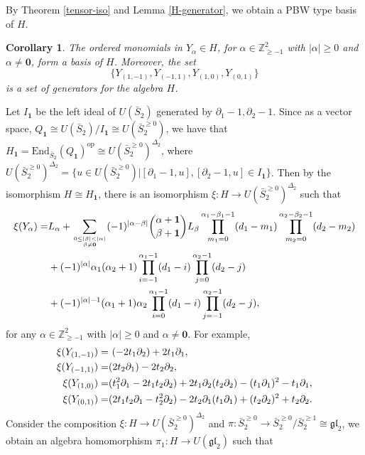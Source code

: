 \documentclass[12pt,a4paper]{amsart}
\newtheorem{Corollary}[Theorem]{Corollary}
\def\Z{\mathbb{Z}}
\def\m1{\mathbf{1}}
\def\gl{\mathfrak{gl}}
\def\p{\partial}
\def\a{\alpha}
\def\be{\beta}
\def\bS{\bar{S}_2}
\begin{document}



By Theorem \ref{tensor-iso} and Lemma \ref{H-generator}, we obtain a PBW type basis of $H$.

\begin{Corollary}\label{PBW}
The ordered monomials  in $Y_\a\in H$, for $\a\in \Z_{\geq-1}^2$ with $|\a|\geq0$ and $\a\neq \mathbf{0}$, form a basis of $H$. Moreover, the set $$\{Y_{(1,-1)},Y_{(-1,1)},Y_{(1,0)},Y_{(0,1)}\}$$
 is a set of generators for the algebra $H$.
\end{Corollary}


Let $I_{\mathbf{1}}$ be the left ideal of $U(\bS)$ generated by $\p_1-1,\p_2-1$.  Since  as a vector space, $Q_{\m1}\cong U(\bS)/I_{\mathbf{1}}\cong U(\bS^{\geq 0})$, we have that
$H_{\m1}=\text{End}_{\bar{S}_2}(Q_{\m1})^{\text{op}}\cong U(\bS^{\geq 0})^{\Delta_2}$,
where $U(\bS^{\geq 0})^{\Delta_2}=\{u\in U(\bS^{\geq 0})| [\p_1-1,u], [\p_2-1, u]\in I_{\mathbf{1}}\}$. Then by the isomorphism $H\cong H_{\mathbf{1}}$,
there is an isomorphism $\xi: H\rightarrow U(\bS^{\geq 0})^{\Delta_2}$
such that
\begin{align*} \label{x-operator}
 \xi(Y_{\a})= &L_\a
+\sum_{0\leq|\be|<|\a|\atop \be\neq \mathbf{0}}(-1)^{|\a-\be|}
\binom{\a+\mathbf{1}}{\be+\mathbf{1}}L_\be
\prod_{m_1=0}^{\a_1-\be_1-1}(d_1-m_1)
\prod_{m_2=0}^{\a_2-\be_2-1}(d_2-m_2)\\
&+(-1)^{|\a|}\a_1(\a_2+1)\prod_{i=-1}^{\a_1-1}(d_1-i)
\prod_{j=0}^{\a_2-1}(d_2-j)\\
&+(-1)^{|\a|-1}(\a_1+1)\a_2\prod_{i=0}^{\a_1-1}(d_1-i)
\prod_{j=-1}^{\a_2-1}(d_2-j),\end{align*}
for any $\a\in \Z_{\geq-1}^2$ with $|\a|\geq0$ and $\a\neq\mathbf{0}$.
For example,
 \begin{equation}\label{x-w-def1}
 \aligned  \xi(Y_{(1,-1)})= &\  (-2t_1\p_2)+2t_1\p_1 ,\\
 \xi(Y_{(-1,1)})= &(2t_2\p_1)-2t_2\p_2 ,\\
 \xi(Y_{(1,0)})=&(t_1^2\p_1-2t_1t_2\p_2)+2t_1\p_2(t_2\p_2)-(t_1\p_1)^2-t_1\p_1, \\
 \xi(Y_{(0,1)})=&(2t_1t_2\p_1-t_2^2\p_2)-2t_2\p_1(t_1\p_1)+(t_2\p_2)^2+t_2\p_2. \endaligned\end{equation}
 Consider the composition $\xi: H\rightarrow U(\bS^{\geq 0})^{\Delta_2}$
 and $\pi:\bS^{\geq 0}\rightarrow \bS^{\geq 0}/\bS^{\geq 1} \cong \gl_2$,
 we obtain an algebra homomorphism $\pi_1: H\rightarrow U(\gl_2)$
 such that
\end{document}
